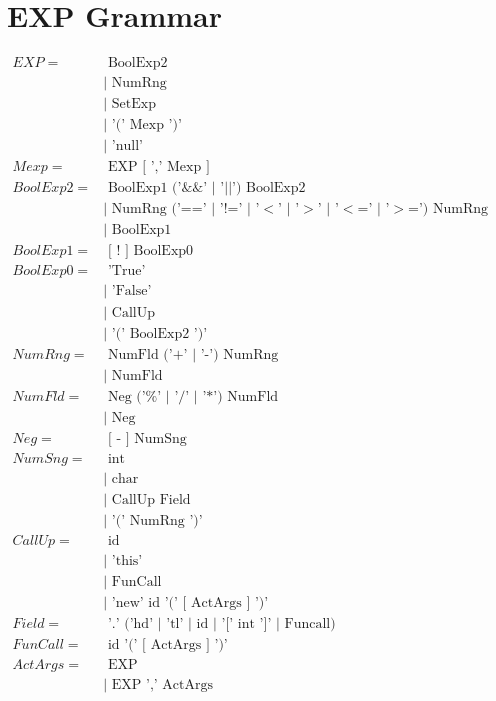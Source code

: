 \documentclass[10pt,a4paper]{article}
\begin{document}
\section{EXP Grammar}
\begin{math}
\begin{aligned}
EXP =& \text{ BoolExp2}
 \\&|\text{ NumRng} 
 \\&|\text{ SetExp }
 \\&|\text{ '(' Mexp ')'}
 \\&|\text{ 'null'}\\
Mexp =& \text{ EXP [ ',' Mexp ]}\\
BoolExp2 =& \text{ BoolExp1 ('\&\&' $|$ '$||$') BoolExp2}
 \\&|\text{ NumRng ('==' $|$ '!=' $|$ '$<$' $|$ '$>$' $|$ '$<$=' $|$ '$>$=') NumRng}
 \\&|\text{ BoolExp1}\\
BoolExp1 =& \text{ [ ! ] BoolExp0}\\
BoolExp0 =& \text{ 'True'}
 \\&|\text{ 'False'}
 \\&|\text{ CallUp }
 \\&|\text{ '(' BoolExp2 ')'}\\
NumRng =& \text{ NumFld ('+' $|$ '-') NumRng}
 \\&|\text{ NumFld}\\
NumFld =& \text{ Neg ('\%' $|$ '/' $|$ '*') NumFld}
 \\&|\text{ Neg}\\
Neg =& \text{ [ - ] NumSng}\\
NumSng =& \text{ int}
 \\&|\text{ char }
 \\&|\text{ CallUp Field}
 \\&|\text{ '(' NumRng ')' }\\
CallUp =& \text{ id}
 \\&|\text{ 'this' }
 \\&|\text{ FunCall }
 \\&|\text{ 'new' id '(' [ ActArgs ] ')' } \\
Field =&\text{ '.' ('hd' $|$ 'tl' $|$ id $|$ '[' int ']' $|$ Funcall) }\\
FunCall =&\text{ id '(' [ ActArgs ] ')'} \\
ActArgs =&\text{ EXP }
 \\&|\text{ EXP ',' ActArgs }
\end{aligned}
\end{math}
\end{document}
